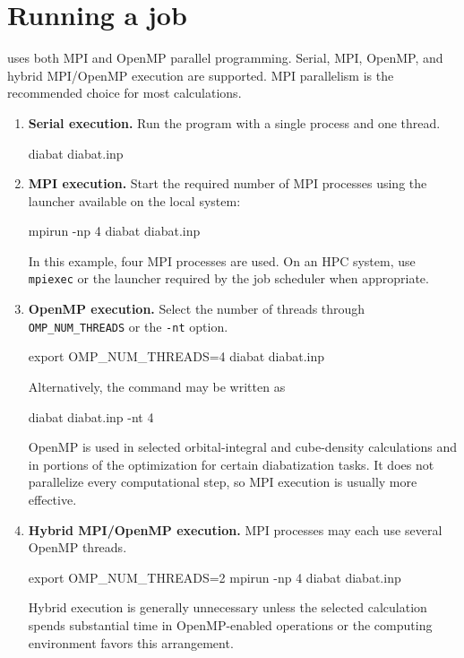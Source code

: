 \section{Running a job}\label{sec-running}
\progname{} uses both MPI and OpenMP parallel programming. Serial, MPI, OpenMP, and hybrid MPI/OpenMP execution are supported. MPI parallelism is the recommended choice for most calculations.

\begin{enumerate}
\item \textbf{Serial execution.} Run the program with a single process and one thread.
\begin{lst-installation}
diabat diabat.inp
\end{lst-installation}
\item \textbf{MPI execution.} Start the required number of MPI processes using the launcher available on the local system:
\begin{lst-installation}
mpirun -np 4 diabat diabat.inp
\end{lst-installation}
In this example, four MPI processes are used.
On an HPC system, use \texttt{mpiexec} or the launcher required by the job scheduler when appropriate.
\item \textbf{OpenMP execution.} Select the number of threads through \texttt{OMP\_NUM\_THREADS} or the \texttt{-nt} option.
\begin{lst-installation}
export OMP_NUM_THREADS=4
diabat diabat.inp
\end{lst-installation}
Alternatively, the command may be written as
\begin{lst-installation}
diabat diabat.inp -nt 4
\end{lst-installation}
OpenMP is used in selected orbital-integral and cube-density calculations and in portions of the optimization for certain diabatization tasks. It does not parallelize every computational step, so MPI execution is usually more effective.
\item \textbf{Hybrid MPI/OpenMP execution.} MPI processes may each use several OpenMP threads.
\begin{lst-installation}
export OMP_NUM_THREADS=2
mpirun -np 4 diabat diabat.inp
\end{lst-installation}
Hybrid execution is generally unnecessary unless the selected calculation spends substantial time in OpenMP-enabled operations or the computing environment favors this arrangement.
\end{enumerate}

